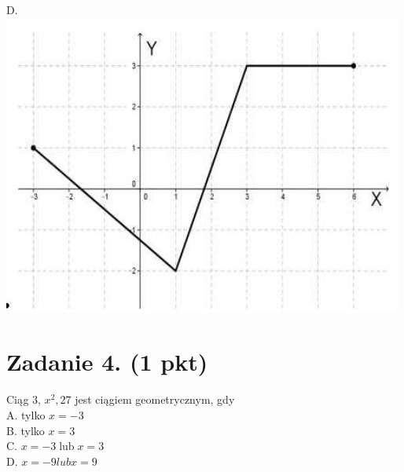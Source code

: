\documentclass[10pt]{article}
\begin{document}
D.\\
\includegraphics[max width=\textwidth, center]{2024_11_21_8e981e1ab2c7e641f462g-02}

\section*{Zadanie 4. (1 pkt)}
Ciąg 3, \(x^{2}, 27\) jest ciągiem geometrycznym, gdy\\
A. tylko \(x=-3\)\\
B. tylko \(x=3\)\\
C. \(x=-3 \operatorname{lub} x=3\)\\
D. \(x=-9 l u b x=9\)
\end{document}
